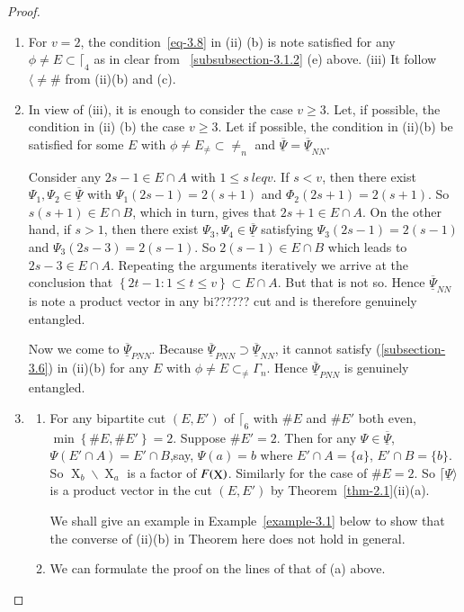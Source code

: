 \documentclass[a4paper,12pt]{article}
\DeclareMathOperator{\x}{\mathrm{X}}
\theoremstyle{definition}
\theoremstyle{underlinethm}
\theoremstyle{definition}
\begin{document}
\begin{proof}
\begin{enumerate}[label=(\roman*)]
\item For $v=2$, the condition~\eqref{eq-3.8}   in (ii) (b) is note satisfied for any $\phi \neq E \subset \lceil_{4}$ as in clear from ~\eqref{subsubsection-3.1.2} (e) above. (iii) It follow $\langle \neq \#$ from (ii)(b) and (c).

\item In view of (iii), it is enough to consider the case $v \geq 3$. Let, if possible, the condition in (ii) (b) the case $v \geq 3$. Let if possible, the condition in (ii)(b) be satisfied for some $E$ with $\phi \neq E_{\neq} \subset \neq_{n}$ and $\underline{\overline{\Psi}}= \underline{\overline{\Psi}}_{NN}$.

Consider any $2s-1 \in E \cap A$ with $1 \leq s\ leq v$. If $s < v$, then there exist $\Psi_{1}, \Psi_{2} \in \underline{\overline{\Psi}}$ with $\Psi_{1} (2s-1) = 2(s + 1)$ and $\Phi_{2} (2s+1) = 2(s+ 1)$. So $s(s+ 1) \in E \cap B$, which in turn, gives that $2s+1 \in E \cap A$. On the other hand, if $s > 1$, then there exist $\Psi_{3}, \Psi_{4} \in \underline{\overline{\Psi}}$ satisfying $\Psi_{3}(2s-1)= 2(s-1)$ and $\Psi_{3}(2s-3) =2 (s-1)$. So $2(s-1) \in E \cap B$ which leads to $2s-3 \in E \cap A$. Repeating the arguments iteratively we arrive at the conclusion that $\left\{2t-1 : 1 \leq t \leq v \right\} \subset E \cap A$. But that is not so. Hence $\underline{\overline{\Psi}}_{NN}$ is note a product vector in any bi?????? cut and is therefore genuinely entangled.  

Now we come to $\underline{\overline{\Psi}}_{PNN}$. Because $\underline{\overline{\Psi}}_{PNN} \supset \underline{\overline{\Psi}}_{NN}$, it cannot satisfy (\eqref{subsection-3.6}) in (ii)(b) for any $E$ with $\phi \neq E \subset_{\neq} \Gamma_{n}$. Hence $\underline{\overline{\Psi}}_{PNN}$ is genuinely entangled.

\item 
\begin{enumerate}[label=(\alph*)]
\item For any bipartite cut $(E, E')$ of $\lceil_{6}$ with $\#E$ and $\#E'$ both even,\break $\min\left\{\# E, \# E'\right\}=2$. Suppose $\#E'=2$. Then for any $\Psi \in \underline{\overline{\Psi}}$, $\Psi (E' \cap A) = E' \cap B$,say, $\Psi(a) = b$ where $E'\cap A = \{a\}$, $E'\cap B=\{b\}$. So $\x_{b} \smallsetminus \x_{a}$ is a factor of $F(\bold{\x})$. Similarly for the case of $\# E=2$. So $\lceil\underline{\Psi}\rangle$ is a product vector in the cut $(E, E')$ by Theorem~\eqref{thm-2.1}(ii)(a).

We shall give an example in Example~\eqref{example-3.1} below to show that the converse of (ii)(b) in Theorem here does not hold in general.

\item We can formulate the proof on the lines of that of (a) above.

\end{enumerate}

\end{enumerate}

\end{proof}
\end{document}
